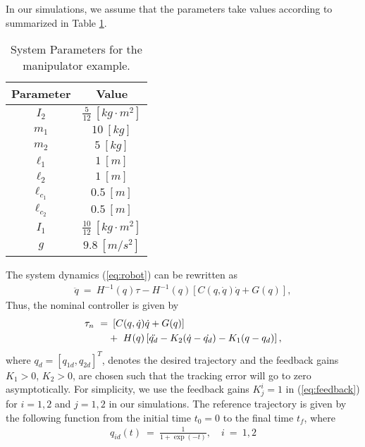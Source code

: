 \documentclass[twoside,leqno,onecolumn]{article}
\begin{document}
In our simulations, we assume that the parameters take values according to \cite{Spong92} summarized in Table \ref{tab:robot}.
\begin{table}
\caption{System Parameters for the manipulator example.}
\label{tab:robot}
\centering
\begin{tabular}{|c|c|}
  \hline
Parameter & Value \\\hline
  $I_2$ & $\frac{5}{12}~ [kg\cdot m^2]$ \\\hline
  $m_1$ & $10~ [kg]$ \\\hline
  $m_2$ & $5~ [kg]$\\\hline
  $\ell_1$ & $1~ [m]$ \\\hline
  $\ell_2$ & $1 ~[m]$ \\\hline
  $\ell_{c_1}$ & $0.5 ~[m]$ \\\hline
  $\ell_{c_2}$  & $0.5~ [m]$\\\hline
  $I_1$ & $\frac{10}{12}~[kg\cdot m^2]$ \\\hline
  $g$ & $9.8~ [m/s^2]$ \\
  \hline
\end{tabular}
\end{table}
The system dynamics (\ref{eq:robot}) can be rewritten as
\begin{align}
\label{eq:norm_robot}
\ddot{q}~=~H^{-1}(q) \tau -  H^{-1}(q) \left[C(q,\dot{q})\dot{q}+ G(q)\right],
\end{align}
Thus, the nominal controller is given by
\begin{align}
\tau_{n}~=&~\left[C(q,\dot{q})\dot{q}+ G(q)\right] \notag\\
&+~ H(q)\left[\ddot{q_{d}} - K_2(\dot{q}-\dot{q_{d}})-K_1(q-q_{d})\right],
\end{align}
where $q_d =[q_{1d},q_{2d}]^T$, denotes the desired trajectory and the feedback gains $K_1>0$, $K_2>0$, are chosen such that the tracking error will go to zero asymptotically. For simplicity, we use the feedback gains $K^i_j = 1$ in (\ref{eq:feedback}) for $i = 1,2$ and $j = 1,2$ in our simulations.
The reference trajectory is given by the following function from the initial time $t_0 = 0$ to the final time $t_f$, where
\begin{align*}
q_{id}(t)~=~\frac{1}{1+\exp{(-t)}}, \quad  i~=~1,2
\end{align*}
\end{document}
